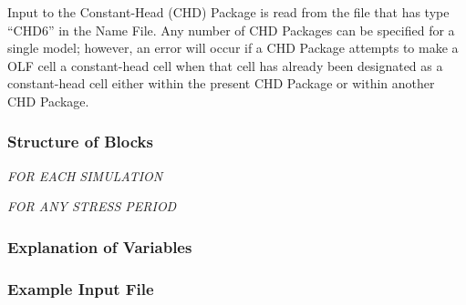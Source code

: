 
Input to the Constant-Head (CHD) Package is read from the file that has type ``CHD6'' in the Name File.  Any number of CHD Packages can be specified for a single model; however, an error will occur if a CHD Package attempts to make a OLF cell a constant-head cell when that cell has already been designated as a constant-head cell either within the present CHD Package or within another CHD Package.

\vspace{5mm}
\subsubsection{Structure of Blocks}
\vspace{5mm}

\noindent \textit{FOR EACH SIMULATION}


\vspace{5mm}
\noindent \textit{FOR ANY STRESS PERIOD}

\packageperioddescription

\vspace{5mm}
\subsubsection{Explanation of Variables}
\begin{description}

\end{description}

\vspace{5mm}
\subsubsection{Example Input File}



